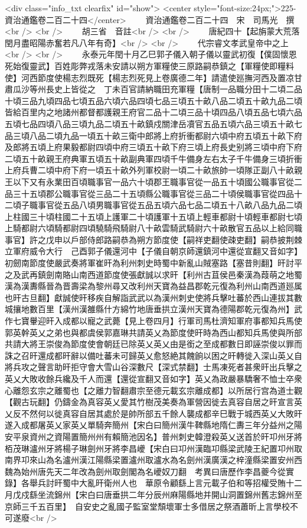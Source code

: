 <div class="info_txt clearfix" id="show">
<center style="font-size:24px;">225-資治通鑑卷二百二十四</center>
  　　資治通鑑卷二百二十四　宋　司馬光　撰<br />
<br />
　　胡三省　音註<br />
<br />
　　唐紀四十【起旃蒙大荒落閏月盡昭陽赤奮若凡八年有奇】<br />
<br />
　　代宗睿文孝武皇帝中之上<br />
<br />
　　永泰元年閏十月乙巳郭子儀入朝子儀以靈武初復【僕固懷恩死始復靈武】百姓彫弊戎落未安請以朔方軍糧使三原路嗣恭鎮之【軍糧使即糧料使】河西節度使楊志烈既死【楊志烈死見上卷廣德二年】請遣使廵撫河西及置凉甘肅瓜沙等州長史上皆從之　丁未百官請納職田充軍糧【唐制一品職分田十二頃二品十頃三品九頃四品七頃五品六頃六品四頃七品三頃五十畝八品二頃五十畝九品二頃皆給百里内之地諸州都督都護親王府官二品十二頃三品十頃四品八頃五品七頃六品五頃七品四頃八品三頃九品二頃五十畝鎮戍關津岳凟官五品五頃六品三頃五十畝七品三頃八品二頃九品一頃五十畝三衛中郎將上府折衝都尉六頃中府五頃五十畝下府及郎將五頃上府果毅都尉四頃中府三頃五十畝下府三頃上府長史别將三頃中府下府二頃五十畝親王府典軍五頃五十畝副典軍四頃千牛備身左右太子千牛備身三頃折衝上府兵曹二頃中府下府一頃五十畝外列軍校尉一頃二十畝旅帥一頃隊正副八十畝親王以下又有永業田百頃職事官一品六十頃郡王職事官從一品五十頃國公職事官從二品三十五頃郡公職事官從三品二十五頃縣公職事官從三品二十頃侯職事官從四品十二頃子職事官從五品八頃男職事官從五品五頃六品七品二頃五十八畝八品九品二頃上柱國三十頃柱國二十五頃上護軍二十頃護軍十五頃上輕車都尉十頃輕車都尉七頃上騎都尉六頃騎都尉四頃驍騎飛騎尉八十畝雲騎武騎尉六十畝散官五品以上給同職事官】許之戊申以戶部侍郎路嗣恭為朔方節度使【嗣祥吏翻使疎吏翻】嗣恭披荆棘立軍府威令大行　己酉郭子儀還河中【子儀自朝京師還鎮河中還從宣翻又音如字】初劒南節度使嚴武奏將軍崔旰為利州刺史時蜀中新亂山賊塞路【塞昔則翻】旰討平之及武再鎮劍南賂山南西道節度使張獻誠以求旰【利州古苴侯邑秦漢為葭萌之地蜀漢為漢夀縣晉為晋壽梁為黎州尋又改利州天寶為益昌郡乾元復為利州山南西道廵属也旰古旦翻】獻誠使旰移疾自解詣武武以為漢州刺史使將兵擊吐蕃於西山連拔其數城攘地數百里【漢州漢雒縣什方綿竹地唐垂拱立漢州天寶為德陽郡乾元復為州】武作七寶轝迎旰入成都以寵之武薨【見上卷四月】行軍司馬杜濟知軍府事都知兵馬使郭英幹英乂之弟也與都虞侯郭嘉琳共請英乂為節度使旰時為西山都知兵馬使與所部共請大將王崇俊為節度使會朝廷已除英乂英乂由是銜之至成都數日即誣崇俊以罪而誅之召旰還成都旰辭以備吐蕃未可歸英乂愈怒絶其餽餉以困之旰轉徙入深山英乂自將兵攻之聲言助旰拒守會大雪山谷深數尺【深式禁翻】士馬凍死者甚衆旰出兵擊之英乂大敗收餘兵纔及千人而還【還從宣翻又音如字】英乂為政嚴暴驕奢不恤士卒衆心離怨玄宗之離蜀也【之離力智翻肅宗至德元載玄宗離成都】以所居行宫為道士觀【觀古玩翻】仍鑄金為真容英乂愛其竹樹茂美奏為軍營因徙去真容自居之旰宣言英乂反不然何以徙真容自居其處於是帥所部五千餘人襲成都辛巳戰于城西英乂大敗旰遂入成都屠英乂家英乂單騎奔簡州【宋白曰簡州漢牛鞞縣地隋仁夀三年分益州之陽安平泉資州之資陽置簡州州有賴簡池因名】普州刺史韓澄殺英乂送首於旰卭州牙將栢茂琳瀘州牙將楊子琳劍州牙將李昌巙【宋白曰卭州漢臨卭縣梁武陵王紀置卭州取南界卭來山為名瀘州漢江陽縣梁置瀘州取瀘水為名劍州漢廣漢之梓潼縣梁置安州西魏為始州唐先天二年改為劍州取劍閣為名巙奴刀翻　考異曰唐歷作李昌夔今從實錄】各舉兵討旰蜀中大亂旰衛州人也　華原令顧繇上言元載子伯和等招權受賄十二月戊戍繇坐流錦州【宋白曰唐垂拱二年分辰州麻陽縣地并開山洞置錦州舊志錦州至京師三千五百里】　自安史之亂國子監室堂頹壞軍士多借居之祭酒蕭昕上言學校不可遂廢<br />
